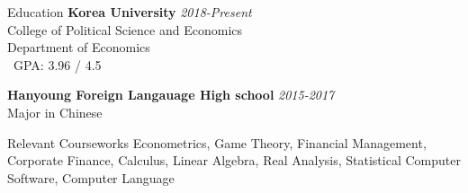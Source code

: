 \documentclass{resume} %
\begin{document}

\begin{rSection}{Education}
{\bf Korea University} \hfill {\em 2018-Present} \\ 
College of Political Science and Economics\\
Department of Economics\smallskip \\\
GPA: 3.96 / 4.5

{\bf Hanyoung Foreign Langauage High school} \hfill {\em 2015-2017}\\
Major in Chinese\smallskip
\end{rSection}
\begin{rSection}{Relevant Courseworks}
Econometrics, Game Theory, Financial Management, Corporate Finance, Calculus, Linear Algebra, Real Analysis, Statistical Computer Software, Computer Language
\end{rSection}

\end{document}
